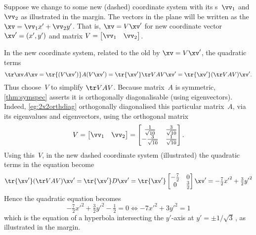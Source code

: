 \begin{example}
\begin{solution}
{}%
%
Suppose we change to some new (dashed) coordinate system with its s~\(\vv_1\) and~\(\vv_2\) as illustrated in the margin.
The vectors in the plane will be written as the  \(\xv=\vv_1x'+\vv_2y'\).
That is, \(\xv=V\xv'\) for new coordinate vector \(\xv'=(x',y')\) and matrix \(V=\begin{bmatrix} \vv_1&\vv_2 \end{bmatrix}\).

In the new coordinate system, related to the old by \(\xv=V\xv'\), the quadratic terms 
\begin{equation*}
\tr\xv A\xv
=\tr{(V\xv')} A(V\xv')
=\tr{\xv'}\tr VAV\xv'
=\tr{\xv'}(\tr VAV)\xv'.
\end{equation*}
Thus choose~\(V\) to simplify \(\tr VAV\).
Because matrix~\(A\) is symmetric, \autoref{thm:symspec} asserts it is orthogonally diagonalisable (using eigenvectors).
Indeed, \autoref{eg:2x2orthdiag} orthogonally diagonalised this particular matrix~\(A\), via its eigenvalues and eigenvectors, using the orthogonal matrix
\begin{equation*}
V=\begin{bmatrix} \vv_1&\vv_2 \end{bmatrix}
=\begin{bmatrix} \frac1{\sqrt{10}} & \frac3{\sqrt{10}}
\\ -\frac3{\sqrt{10}}& \frac1{\sqrt{10}} \end{bmatrix}.
\end{equation*}
Using this~\(V\), in the new dashed coordinate system (illustrated) the quadratic terms in the equation become
%
\begin{equation*}
\tr{\xv'}(\tr VAV)\xv'
=\tr{\xv'}D\xv'
=\tr{\xv'}\begin{bmatrix} -\tfrac72&0\\0&\tfrac32 \end{bmatrix}\xv'
=-\tfrac72{x'}^2+\tfrac32{y'}^2
\end{equation*}
Hence the quadratic equation becomes
\begin{equation*}
-\tfrac72{x'}^2+\tfrac32{y'}^2-\tfrac12=0
\iff -7{x'}^2+3{y'}^2=1
\end{equation*}
which is the equation of a hyperbola intersecting the \(y'\)-axis at \(y'=\pm1/\sqrt3\)\,, as illustrated in the margin.
\end{solution}
\end{example}





